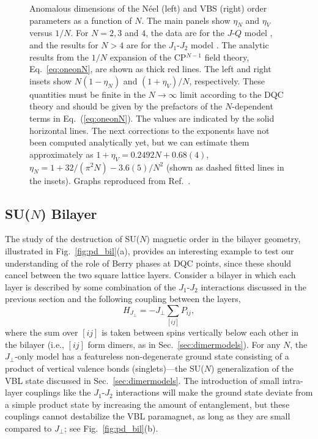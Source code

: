 \documentclass[range]{ar2e}
\begin{document}
\begin{figure}
\centerline{}
 \caption{ \label{fig:exp} Anomalous dimensions of the N\'eel (left) and VBS (right)
  order parameters as a function of $N$. The main panels show $\eta_N$ and $\eta_V$ versus $1/N$. For $N=2,3$ and $4$, the data are 
  for the $J$-$Q$ model \cite{lou2009:sun}, and the results for $N>4$ are for the $J_1$-$J_2$ model \cite{kaul2011:j1j2}. The analytic 
  results from the $1/N$ expansion of the CP$^{N-1}$ field theory, Eq.~\ref{eq:oneonN}, are shown as thick red lines. The left and 
  right insets show $N(1-\eta_N)$ and $(1+\eta_V)/N$, respectively. These quantities must be finite in the  $N\rightarrow \infty$ 
  limit according to the DQC theory and should be given by the prefactors of the $N$-dependent terms in Eq.~(\ref{eq:oneonN}). The values
  are indicated by the solid horizontal lines. The next corrections to the exponents have not been computed analytically yet, but we can estimate 
  them approximately as $1+\eta_V = 0.2492 N + 0.68(4)$, $\eta_N = 1+32/(\pi^2 N)-3.6(5)/N^2$ (shown as dashed fitted lines in the insets). 
  Graphs reproduced from Ref.~\cite{kaul2011:j1j2}.}
\end{figure}

\subsection{SU($N$) Bilayer}
\label{ss:bilN}

The study of the destruction of SU($N$) magnetic order in the bilayer geometry, illustrated in Fig.~\ref{fig:pd_bil}(a), provides an interesting 
example to test our understanding of the role of Berry phases at DQC points, since these should cancel between the two square lattice layers. 
Consider a bilayer in which each layer is described by some combination of the $J_1$-$J_2$ interactions discussed in the previous section and the 
following coupling between the layers,
\begin{equation}
 H_{J_\perp} = -J_\perp \sum_{[ij]} P_{ij},
\end{equation}
where the sum over $[ij]$ is taken between spins vertically below each other in the bilayer (i.e., $[ij]$ form dimers, as in Sec.~\ref{sec:dimermodels}). For 
any $N$, the $J_\perp$-only model has a featureless non-degenerate ground state consisting of a product of vertical valence bonds (singlets)---the SU($N$)
generalization of the VBL state discussed in Sec.~\ref{sec:dimermodels}. The introduction of small intra-layer couplings like the $J_1$-$J_2$ interactions will 
make the ground state deviate from a simple product state by increasing the amount of entanglement, but these couplings cannot destabilize the VBL paramagnet,
as long as they are small compared to $J_\perp$; see Fig.~\ref{fig:pd_bil}(b). 
\end{document}
